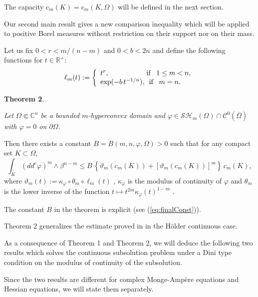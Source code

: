 \documentclass[12pt]{amsart}
\theoremstyle{definition}
\numberwithin{theorem}{section}
\numberwithin{equation}{section}
\newcommand{\R}{\mathbb{R}}
\newcommand{\C}{\mathbb{C}}
\begin{document}
The capacity $\text{c}_m (K) = \text{c}_m (K,\Omega)$ will be defined in the next section. 

Our second main result gives a new comparison inequality which will be applied to  positive Borel measures without restriction on their support nor on their mass. 

Let us fix $0 < r < m \slash (n-m)$ and $0 < b < 2 n$ and define the following functions for $t \in \R^+$:
\begin{equation}\label{eq:estimatefunction}
\ell_m (t) := \left\{\begin{array}{lcl} 
 t^{r}, \,  \, \, \, \, \, \, \, \, \, \,   \, \, \, \,  \, \, \, \, \, \, \, \, \, \,    \,  \, \, \, \, \, \, \hbox{if} \, \,  \, \, \, 1 \leq m < n, \\
   \exp ( -b \, t^{- 1 \slash n}), \, \, \,  \hbox{if} \, \, \, \, \,  m = n.
\end{array}\right.
\end{equation}
 
 \smallskip
 
 {\bf Theorem 2}.{ \it Let $\Omega \Subset \C^n$ be a bounded $m$-hyperconvex  domain and $\varphi \in \mathcal{SH}_m (\Omega)  \cap \mathcal{C}^0 (\bar{\Omega})$ with $\varphi = 0$ on $\partial \Omega$. 
 
 Then  there exists a constant $B = B (m,n, \varphi,\Omega) > 0$ such that for any compact set $K \subset \Omega$, 
$$
\int_{K}(dd^c\varphi)^m\wedge\beta^{n-m}  \leq  B \, \left\{\vartheta_m  (c_m (K)) + \left[\vartheta_m  (c_m (K))\right]^m\right\} \, c_m (K),
$$
where
$\vartheta_m (t) := \kappa_\varphi \circ \theta_m \circ \ell_m (t)$ , $\kappa_\varphi$ is the modulus of continuity of $\varphi$ and $\theta_m$ is the lower inverse  of the function $t \longmapsto t^{2m} \kappa_\varphi (t)^{1 - m}$ . }

 \smallskip
 \smallskip
  The constant $B$ in the theorem is explicit (see  (\ref{eq:finalConst})).
 
 Theorem 2  generalizes the estimate proved in \cite{BZ20} in the H\"older continuous case. 



 \smallskip
 \smallskip


 As a consequence of Theorem 1 and Theorem 2, we will deduce the following two results which solves the continuous subsolution problem under a Dini type condition on the modulus of continuity of the subsolution.

Since the two results are different for complex Monge-Amp\`ere equations and Hessian equations, we will state them separately.
 \smallskip
 
\end{document}
